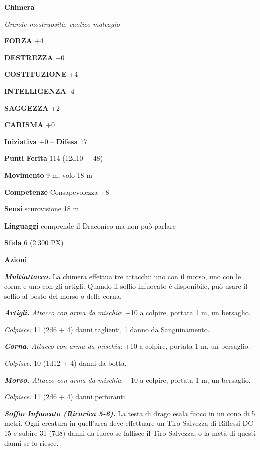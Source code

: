 \begin{multicols}{2}
	\medskip{}\textbf{Chimera}

	\textit{Grande mostruosità, caotico malvagio}

	\textbf{FORZA} +4

	\textbf{DESTREZZA} +0

	\textbf{COSTITUZIONE} +4

	\textbf{INTELLIGENZA} -4

	\textbf{SAGGEZZA} +2

	\textbf{CARISMA} +0

	\textbf{Iniziativa} +0 -- \textbf{Difesa} 17

	\textbf{Punti Ferita} 114 (12d10 + 48)

	\textbf{Movimento} 9 m, volo 18 m

	\textbf{Competenze} Consapevolezza +8

	\textbf{Sensi} scurovisione 18 m

	\textbf{Linguaggi} comprende il Draconico ma non può parlare

	\textbf{Sfida} 6 (2.300 PX)

	\textbf{Azioni}

	\textit{\textbf{Multiattacco.}} La chimera effettua tre attacchi: uno con il morso, uno con le corna e uno con gli artigli. Quando il soffio infuocato è disponibile, può usare il soffio al posto del morso o delle corna.

	\textit{\textbf{Artigli.} Attacco con arma da mischia}: +10 a colpire, portata 1 m, un bersaglio.

	\textit{Colpisce:} 11 (2d6 + 4) danni taglienti, 1 danno da Sanguinamento.

	\textit{\textbf{Corna.} Attacco con arma da mischia}: +10 a colpire, portata 1 m, un bersaglio.

	\textit{Colpisce:} 10 (1d12 + 4) danni da botta.

	\textit{\textbf{Morso.} Attacco con arma da mischia}: +10 a colpire, portata 1 m, un bersaglio.

	\textit{Colpisce:} 11 (2d6 + 4) danni perforanti.

	\textit{\textbf{Soffio Infuocato (Ricarica 5-6).}} La testa di drago esala fuoco in un cono di 5 metri. Ogni creatura in quell'area deve effettuare un Tiro Salvezza di Riflessi DC 15 e subire 31 (7d8) danni da fuoco se fallisce il Tiro Salvezza, o la metà di questi danni se lo riesce.


\end{multicols}
